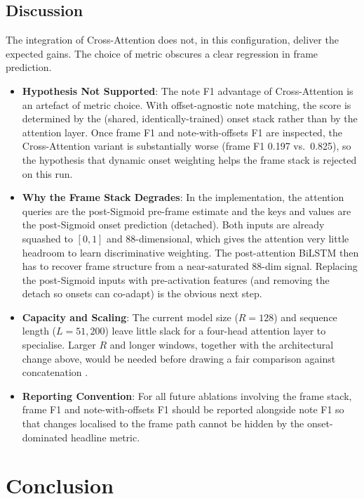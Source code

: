 \documentclass{article}
\begin{document}
\subsection{Discussion}
The integration of Cross-Attention does not, in this configuration, deliver the expected gains. The choice of metric obscures a clear regression in frame prediction.

\begin{itemize}
    \item \textbf{Hypothesis Not Supported}: The note F1 advantage of Cross-Attention is an artefact of metric choice. With offset-agnostic note matching, the score is determined by the (shared, identically-trained) onset stack rather than by the attention layer. Once frame F1 and note-with-offsets F1 are inspected, the Cross-Attention variant is substantially worse (frame F1 0.197 vs.\ 0.825), so the hypothesis that dynamic onset weighting helps the frame stack is rejected on this run.

    \item \textbf{Why the Frame Stack Degrades}: In the implementation, the attention queries are the post-Sigmoid pre-frame estimate and the keys and values are the post-Sigmoid onset prediction (detached). Both inputs are already squashed to $[0, 1]$ and 88-dimensional, which gives the attention very little headroom to learn discriminative weighting. The post-attention BiLSTM then has to recover frame structure from a near-saturated 88-dim signal. Replacing the post-Sigmoid inputs with pre-activation features (and removing the detach so onsets can co-adapt) is the obvious next step.

    \item \textbf{Capacity and Scaling}: The current model size ($R=128$) and sequence length ($L=51{,}200$) leave little slack for a four-head attention layer to specialise. Larger $R$ and longer windows, together with the architectural change above, would be needed before drawing a fair comparison against concatenation \cite{hawthorne2018onsetsframesdualobjectivepiano}.

    \item \textbf{Reporting Convention}: For all future ablations involving the frame stack, frame F1 and note-with-offsets F1 should be reported alongside note F1 so that changes localised to the frame path cannot be hidden by the onset-dominated headline metric.
\end{itemize}

\section{Conclusion}
\end{document}
